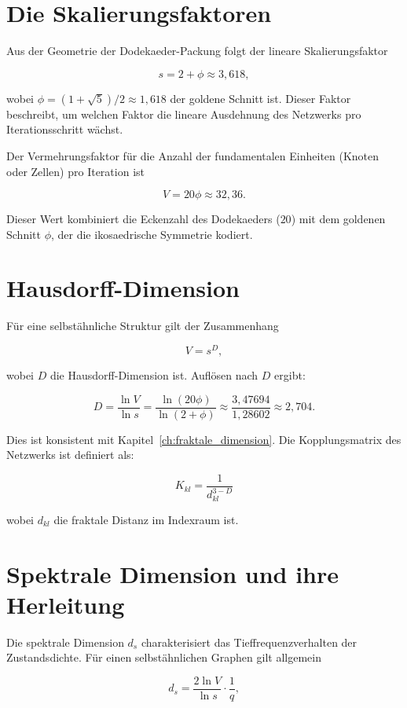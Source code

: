 \section{Die Skalierungsfaktoren}
\label{app:spektrale_skalierung}

Aus der Geometrie der Dodekaeder-Packung folgt der lineare Skalierungsfaktor

\[
s = 2 + \phi \approx 3,618,
\]

wobei \(\phi = (1+\sqrt{5})/2 \approx 1,618\) der goldene Schnitt ist. Dieser Faktor beschreibt, um welchen Faktor die lineare Ausdehnung des Netzwerks pro Iterationsschritt wächst.

Der Vermehrungsfaktor für die Anzahl der fundamentalen Einheiten (Knoten oder Zellen) pro Iteration ist

\[
V = 20\phi \approx 32,36.
\]

Dieser Wert kombiniert die Eckenzahl des Dodekaeders (\(20\)) mit dem goldenen Schnitt \(\phi\), der die ikosaedrische Symmetrie kodiert.

\section{Hausdorff-Dimension}
\label{app:spektrale_hausdorff}

Für eine selbstähnliche Struktur gilt der Zusammenhang

\[
V = s^{D},
\]

wobei \(D\) die Hausdorff-Dimension ist. Auflösen nach \(D\) ergibt:

\[
D = \frac{\ln V}{\ln s}
    = \frac{\ln(20\phi)}{\ln(2+\phi)}
    \approx \frac{3,47694}{1,28602}
    \approx 2,704.
\]

Dies ist konsistent mit Kapitel~\ref{ch:fraktale_dimension}. Die Kopplungsmatrix des Netzwerks ist definiert als:

\[
K_{kl} = \frac{1}{d_{kl}^{3-D}}
\]

wobei \(d_{kl}\) die fraktale Distanz im Indexraum ist.

\section{Spektrale Dimension und ihre Herleitung}
\label{app:spektrale_herleitung}

Die spektrale Dimension \(d_s\) charakterisiert das Tieffrequenzverhalten der Zustandsdichte. Für einen selbstähnlichen Graphen gilt allgemein

\[
d_s = \frac{2 \ln V}{\ln s} \cdot \frac{1}{q},
\]

